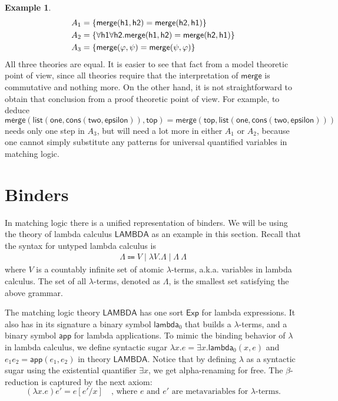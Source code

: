 \documentclass[UTF8]{article}
\newcounter{thmcounter}
\theoremstyle{plain}
\theoremstyle{definition}
\newtheorem{example}[thmcounter]{Example}
\theoremstyle{remark}
\newcommand{\LAMBDA}{\mathsf{LAMBDA}}
\begin{document}
\begin{example}
\begin{align*}
A_1 &= \{{\sf merge(h1, h2) = merge(h2, h1)}\} \\
A_2 &= \{{\sf \forall h1 \forall h2 . merge(h1, h2) = merge(h2, h1)}\} \\
A_3 &= \{\mathsf{merge}(\varphi, \psi) = \mathsf{merge}(\psi, \varphi)\}
\end{align*}
All three theories are equal. It is easier to see that fact from a model theoretic point of view, since all theories require that the interpretation of $\mathsf{merge}$ is commutative and nothing more. On the other hand, it is not straightforward to obtain that conclusion from a proof theoretic point of view. For example, to deduce $\mathsf{merge}(\mathsf{list}(\mathsf{one}, \mathsf{cons}(\mathsf{two}, \mathsf{epsilon})), \mathsf{top}) = \mathsf{merge}(\mathsf{top}, \mathsf{list}(\mathsf{one}, \mathsf{cons}(\mathsf{two}, \mathsf{epsilon})))$ needs only one step in $A_3$, but will need a lot more in either $A_1$ or $A_2$, because one cannot simply substitute any patterns for universal quantified variables in matching logic.

\end{example}



\section{Binders}

In matching logic there is a unified representation of binders. We will be using the theory of lambda calculus $\LAMBDA$ as an example in this section. Recall that the syntax for untyped lambda calculus is
\begin{align*}
\Lambda \Coloneqq V \mid \lambda V . \Lambda \mid \Lambda \ \Lambda
\end{align*}
where $V$ is a countably infinite set of atomic $\lambda$-terms, a.k.a. variables in lambda calculus. The set of all $\lambda$-terms, denoted as $\Lambda$, is the smallest set satisfying the above grammar.

The matching logic theory $\LAMBDA$ has one sort $\mathsf{Exp}$ for lambda expressions. It also has in its signature a binary symbol $\mathsf{lambda}_0$ that builds a $\lambda$-terms, and a binary symbol $\mathsf{app}$ for lambda applications. To mimic the binding behavior of $\lambda$ in lambda calculus, we define syntactic sugar $\lambda x . e = \exists x . \mathsf{lambda}_0(x, e)$  and $e_1e_2 = \mathsf{app}(e_1, e_2)$ in theory $\LAMBDA$. Notice that by defining $\lambda$ as a syntactic sugar using the existential quantifier $\exists x$, we get alpha-renaming for free. The $\beta$-reduction is captured by the next axiom:
\begin{equation*}
(\lambda x . e)e' = e[e'/x] \quad \text{, where $e$ and $e'$ are metavariables for $\lambda$-terms.}
\end{equation*}
\end{document}
